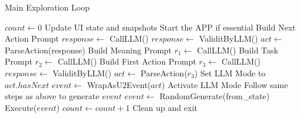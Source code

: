 \documentclass{article}
\begin{document}
\begin{algorithm}
\caption{Main Exploration Loop}
\begin{algorithmic}[1]
  \State $count \gets 0$
    \State Update UI state and snapshots
    \State Start the APP if essential
          \State Build Next Action Prompt
          \State $response \gets$ CallLLM()
          \State $response \gets$ ValiditByLLM()
          \State $act \gets$ ParseAction(response)
        \Else
          \State Build Meaning Prompt
          \State $r_1 \gets$ CallLLM()
          \State Build Task Prompt
          \State $r_2 \gets$ CallLLM()
          \State Build First Action Prompt
          \State $r_3 \gets$ CallLLM()
          \State $response \gets$ ValiditByLLM()
          \State $act \gets$ ParseAction($r_3$)
        \EndIf
        \State Set LLM Mode to $act.hasNext$
        \State $event \gets$ WrapAsU2Event($act$)
        \State Activate LLM Mode
        \State Follow same steps as above to generate $event$
      \Else
        \State $event \gets$ RandomGenerate(from\_state)
        \EndIf
    \State Execute($event$)
    \State $count \gets count + 1$
  \EndWhile
  \State Clean up and exit
\EndFunction
\end{algorithmic}
\end{algorithm}
\end{document}
